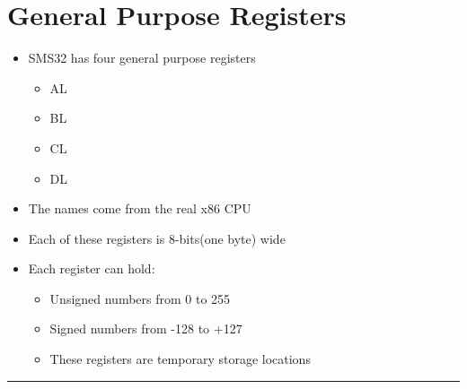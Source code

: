 \documentclass{article}
\begin{document}
  \section{General Purpose Registers}
  \begin{itemize}
    \item{SMS32 has four general purpose registers}
    \begin{itemize}
      \item{AL}
      \item{BL}
      \item{CL}
      \item{DL}
    \end{itemize}
    \item{The names come from the real x86 CPU}
    \item{Each of these registers is 8-bits(one byte) wide}
    \item{Each register can hold:}
    \begin{itemize}
      \item{Unsigned numbers from 0 to 255}
      \item{Signed numbers from -128 to +127}
      \item{These registers are temporary storage locations}
    \end{itemize}
  \end{itemize}

  \begin{center}
    \rule{0.5\textwidth}{.4pt}
  \end{center}
\end{document}
